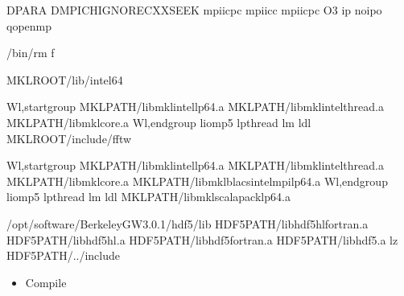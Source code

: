 \documentclass[a4paper,12pt,english]{sphinxmanual}
\begin{document}
\begin{sphinxVerbatim}[commandchars=\\\{\}]
  \PYGZhy{}DPARA \PYGZhy{}DMPICH\PYGZus{}IGNORE\PYGZus{}CXX\PYGZus{}SEEK
  mpiicpc
   mpiicc
   mpiicpc
   \PYGZhy{}O3 \PYGZhy{}ip \PYGZhy{}no\PYGZhy{}ipo \PYGZhy{}qopenmp
 

   /bin/rm \PYGZhy{}f

       MKLROOT/lib/intel64

            \PYGZhy{}Wl,\PYGZhy{}\PYGZhy{}start\PYGZhy{}group 
            MKLPATH/libmkl\PYGZus{}intel\PYGZus{}lp64.a 
            MKLPATH/libmkl\PYGZus{}intel\PYGZus{}thread.a 
            MKLPATH/libmkl\PYGZus{}core.a 
            \PYGZhy{}Wl,\PYGZhy{}\PYGZhy{}end\PYGZhy{}group \PYGZhy{}liomp5 \PYGZhy{}lpthread \PYGZhy{}lm \PYGZhy{}ldl
   MKLROOT/include/fftw


     \PYGZhy{}Wl,\PYGZhy{}\PYGZhy{}start\PYGZhy{}group 
            MKLPATH/libmkl\PYGZus{}intel\PYGZus{}lp64.a 
            MKLPATH/libmkl\PYGZus{}intel\PYGZus{}thread.a 
            MKLPATH/libmkl\PYGZus{}core.a 
            MKLPATH/libmkl\PYGZus{}blacs\PYGZus{}intelmpi\PYGZus{}lp64.a 
            \PYGZhy{}Wl,\PYGZhy{}\PYGZhy{}end\PYGZhy{}group \PYGZhy{}liomp5 \PYGZhy{}lpthread \PYGZhy{}lm \PYGZhy{}ldl
  MKLPATH/libmkl\PYGZus{}scalapack\PYGZus{}lp64.a

       /opt/software/BerkeleyGW\PYGZhy{}3.0.1/hdf5/lib
            HDF5PATH/libhdf5hl\PYGZus{}fortran.a 
            HDF5PATH/libhdf5\PYGZus{}hl.a 
            HDF5PATH/libhdf5\PYGZus{}fortran.a 
            HDF5PATH/libhdf5.a 
            \PYGZhy{}lz
   HDF5PATH/../include

 
\end{sphinxVerbatim}
\begin{itemize}
\item {} 
\sphinxAtStartPar
Compile

\end{itemize}
\end{document}

